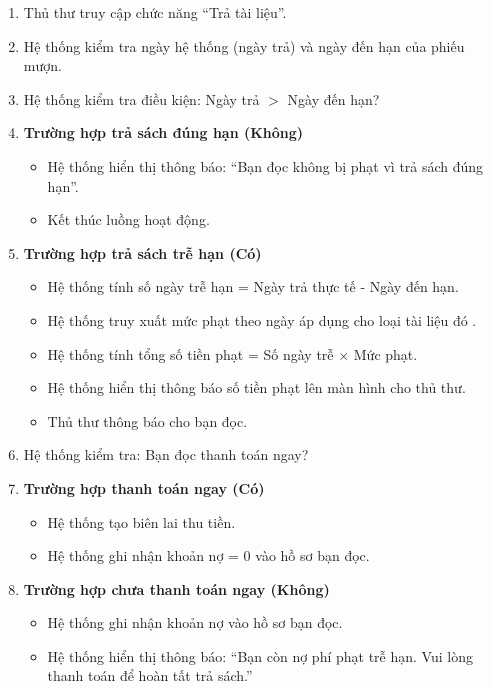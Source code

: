 \begin{enumerate}
    \item Thủ thư truy cập chức năng ``Trả tài liệu''.
    
    \item Hệ thống kiểm tra ngày hệ thống (ngày trả) và ngày đến hạn của phiếu mượn.
    
    \item Hệ thống kiểm tra điều kiện: Ngày trả $>$ Ngày đến hạn?

    \item \textbf{Trường hợp trả sách đúng hạn (Không)}
    \begin{itemize}
        \item Hệ thống hiển thị thông báo: ``Bạn đọc không bị phạt vì trả sách đúng hạn''.
        \item Kết thúc luồng hoạt động.
    \end{itemize}

    \item \textbf{Trường hợp trả sách trễ hạn (Có)}
    \begin{itemize}
        \item Hệ thống tính số ngày trễ hạn = Ngày trả thực tế - Ngày đến hạn.
        
        \item Hệ thống truy xuất mức phạt theo ngày áp dụng cho loại tài liệu đó .
        
        \item Hệ thống tính tổng số tiền phạt = Số ngày trễ $\times$ Mức phạt.
        
        \item Hệ thống hiển thị thông báo số tiền phạt lên màn hình cho thủ thư.
        
        \item Thủ thư thông báo cho bạn đọc.
    \end{itemize}

    \item Hệ thống kiểm tra: Bạn đọc thanh toán ngay?

    \item \textbf{Trường hợp thanh toán ngay (Có)}
    \begin{itemize}
        \item Hệ thống tạo biên lai thu tiền.
        \item Hệ thống ghi nhận khoản nợ = 0 vào hồ sơ bạn đọc.
    \end{itemize}

    \item \textbf{Trường hợp chưa thanh toán ngay (Không)}
    \begin{itemize}
        \item Hệ thống ghi nhận khoản nợ vào hồ sơ bạn đọc.
        \item Hệ thống hiển thị thông báo: ``Bạn còn nợ phí phạt trễ hạn. Vui lòng thanh toán để hoàn tất trả sách.''
    \end{itemize}


\end{enumerate}
